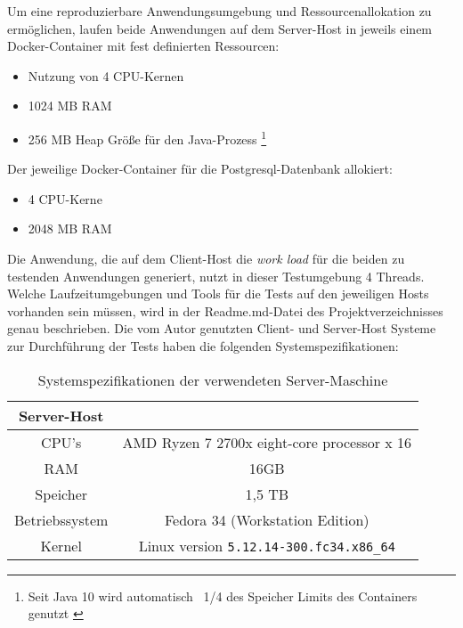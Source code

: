 Um eine reproduzierbare Anwendungsumgebung und Ressourcenallokation zu ermöglichen, laufen beide Anwendungen auf dem Server-Host in
jeweils einem Docker-Container mit fest definierten Ressourcen:
\begin{itemize}
    \item Nutzung von 4 CPU-Kernen
    \item 1024 MB RAM
    \item 256 MB Heap Größe für den Java-Prozess
     \footnote{Seit Java 10 wird automatisch ~1/4 des Speicher Limits des Containers genutzt \cite{Java10ReleaseNotes}}
\end{itemize}
Der jeweilige Docker-Container für die Postgresql-Datenbank allokiert:
\begin{itemize}
    \item 4 CPU-Kerne
    \item 2048 MB RAM
\end{itemize}

Die Anwendung, die auf dem Client-Host die \textit{work load} für die beiden zu testenden Anwendungen generiert,
 nutzt in dieser Testumgebung 4 Threads.
Welche Laufzeitumgebungen und Tools für die Tests auf den jeweiligen Hosts vorhanden sein müssen, 
wird in der Readme.md-Datei des Projektverzeichnisses genau beschrieben.
Die vom Autor genutzten Client- und Server-Host Systeme zur Durchführung der Tests haben die folgenden Systemspezifikationen:

\begin{table}[ht!]
    \centering
    \begin{tabular}{| c | c |}
        \hline
        Server-Host \\
        \hline
        CPU's    & AMD Ryzen 7 2700x eight-core processor x 16  \\
        \hline
        RAM      & 16GB \\
        \hline
        Speicher & 1,5 TB \\
        \hline
        Betriebssystem   & Fedora 34 (Workstation Edition)  \\
        \hline
        Kernel & Linux version \verb|5.12.14-300.fc34.x86_64|\\
        \hline
    \end{tabular}
    \caption{Systemspezifikationen der verwendeten Server-Maschine}
    \label{table:system_host}
\end{table}

